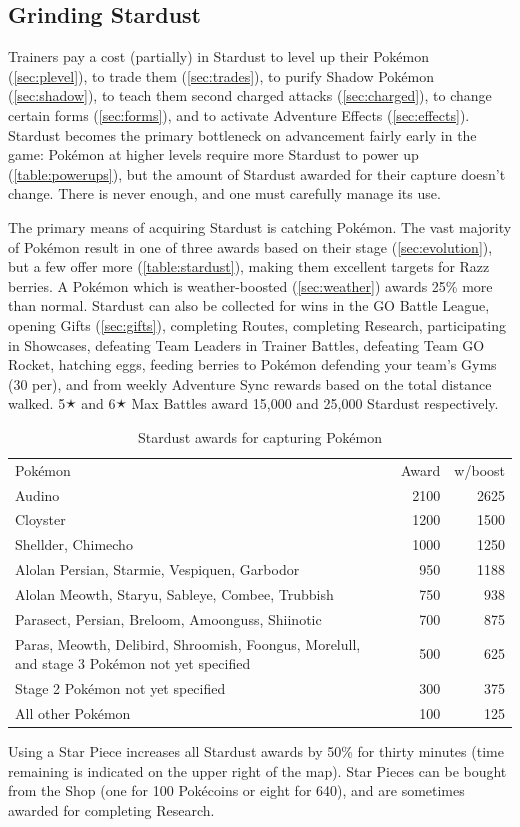 \subsection{Grinding Stardust}
\label{subsec:getdust}
Trainers pay a cost (partially) in Stardust
  to level up their Pokémon (\autoref{sec:plevel}),
  to trade them (\autoref{sec:trades}),
  to purify Shadow Pokémon (\autoref{sec:shadow}),
  to teach them second charged attacks (\autoref{sec:charged}),
  to change certain forms (\autoref{sec:forms}),
  and to activate Adventure Effects (\autoref{sec:effects}).
Stardust becomes the primary bottleneck on advancement fairly early in the game:
  Pokémon at higher levels require more Stardust to power up (\autoref{table:powerups}),
  but the amount of Stardust awarded for their capture doesn't change.
There is never enough, and one must carefully manage its use.

The primary means of acquiring Stardust is catching Pokémon.
The vast majority of Pokémon result in one of three awards based on their stage
 (\autoref{sec:evolution}), but a few offer more (\autoref{table:stardust}),
 making them excellent targets for Razz berries.
A Pokémon which is weather-boosted (\autoref{sec:weather}) awards 25\% more than normal.
Stardust can also be collected for wins in the GO Battle League,
  opening Gifts (\autoref{sec:gifts}),
  completing Routes,
  completing Research,
  participating in Showcases,
  defeating Team Leaders in Trainer Battles,
  defeating Team GO Rocket,
  hatching eggs,
  feeding berries to Pokémon defending your team's Gyms (30 per),
  and from weekly Adventure Sync rewards based on the total distance walked.
5🟉 and 6🟉 Max Battles award 15,000 and 25,000 Stardust respectively.
\begin{table}
\centering
\begin{tabular}{p{}rr}
Pokémon & Award & w/boost\\
\Midrule
Audino & 2100 & 2625\\
Cloyster & 1200 & 1500\\
Shellder, Chimecho & 1000 & 1250\\
Alolan Persian, Starmie, Vespiquen, Garbodor & 950 & 1188\\
Alolan Meowth, Staryu, Sableye, Combee, Trubbish & 750 & 938\\
Parasect, Persian, Breloom, Amoonguss, Shiinotic & 700 & 875\\
Paras, Meowth, Delibird, Shroomish, Foongus,\newline
\hspace{\parindent}Morelull, and stage 3 Pokémon not yet specified & 500 & 625\\
Stage 2 Pokémon not yet specified & 300 & 375\\
All other Pokémon & 100 & 125\\
\end{tabular}
\caption{Stardust awards for capturing Pokémon}
\label{table:stardust}
\end{table}
Using a Star Piece increases all Stardust awards by 50\% for thirty minutes
 (time remaining is indicated on the upper right of the map).
Star Pieces can be bought from the Shop (one for 100 Pokécoins or eight for 640),
  and are sometimes awarded for completing Research.
